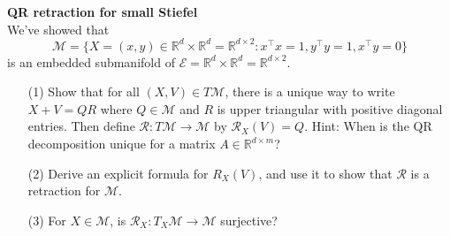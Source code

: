 \documentclass[en, oneside]{assignment}
\begin{document}
\begin{prob} \textbf{QR retraction for small Stiefel}\\
    We've showed that
    \begin{equation*}
        \mathcal{M} = \{X = (x, y) \in \mathbb{R}^d \times \mathbb{R}^d = \mathbb{R}^{d \times 2}: x^\top x = 1, y^\top y = 1, x^\top y = 0\}  
    \end{equation*}
    is an embedded submanifold of $\mathcal{E} = \mathbb{R}^d \times \mathbb{R}^d = \mathbb{R}^{d \times 2}$.
    \begin{itemize}
        \item[(1)] Show that for all $(X, V) \in T\mathcal{M}$, 
        there is a unique way to write $X + V = QR$ where $Q \in \mathcal{M}$ and $R$ is upper triangular with positive diagonal entries. 
        Then define $\mathcal{R} : T\mathcal{M} \rightarrow \mathcal{M}$ by $\mathcal{R}_X(V) = Q$. 
        Hint: When is the QR decomposition unique for a matrix $A \in \mathbb{R}^{d \times m}$?
        \item[(2)] Derive an explicit formula for $R_X(V)$, and use it to show that $\mathcal{R}$ is a retraction for $\mathcal{M}$.
        \item[(3)] For $X \in \mathcal{M}$, is $\mathcal{R}_X: T_X\mathcal{M} \rightarrow \mathcal{M}$ surjective?
    \end{itemize}
\end{prob}
\end{document}
